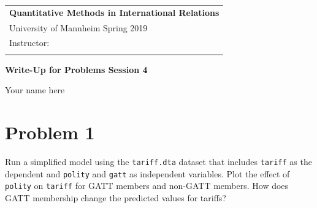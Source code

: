\documentclass[11pt, a4paper]{article} %
\begin{document}
	
	
\setlength{\parindent}{0pt} %
\onehalfspacing				%


\begin{tabular}{p{15.5cm}}
	{\large \textbf{Quantitative Methods in International Relations}} \\
	University of Mannheim Spring 2019  \\ 
	Instructor: \\
	\hline
	\\
\end{tabular}

\vspace*{0.3cm}				%


\begin{center}
	{\Large \textbf{Write-Up for Problems Session 4}}
	\vspace{2mm}
	
	Your name here
	
\end{center} 

\vspace{0.4cm}

\section*{Problem 1}

Run a simplified model using the \texttt{tariff.dta} dataset that includes \texttt{tariff} as the dependent and \texttt{polity} and \texttt{gatt} as independent variables. Plot the effect of \texttt{polity} on \texttt{tariff} for GATT members and non-GATT members. How does GATT membership change the predicted values for tariffs?
	
\end{document}
